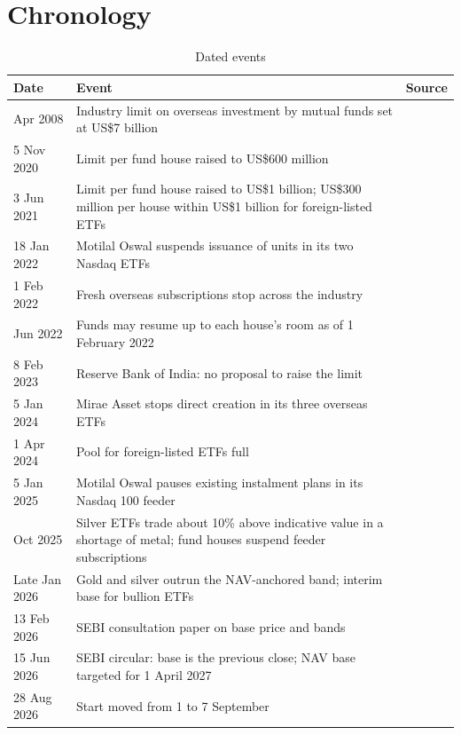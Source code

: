 \section{Chronology}\label{app:chronology}
\begin{table}[!t]
\centering\footnotesize
\caption{Dated events}\label{tab:chronology}
\begin{tabularx}{\textwidth}{L{2.6cm}YL{3.3cm}}
\toprule
Date & Event & Source\\
\midrule
Apr 2008 & Industry limit on overseas investment by mutual funds set at US\$7 billion & \citet{lawasia2026}\\
5 Nov 2020 & Limit per fund house raised to US\$600 million & \citet{bs2020limit}\\
3 Jun 2021 & Limit per fund house raised to US\$1 billion; US\$300 million per house within US\$1 billion for foreign-listed ETFs & \citet{bs2021limit}\\
18 Jan 2022 & Motilal Oswal suspends issuance of units in its two Nasdaq ETFs & \citet{bs2022motilal}\\
1 Feb 2022 & Fresh overseas subscriptions stop across the industry & \citet{pti2022resume}\\
Jun 2022 & Funds may resume up to each house's room as of 1 February 2022 & \citet{pti2022resume}\\
8 Feb 2023 & Reserve Bank of India: no proposal to raise the limit & \citet{bs2023rbi}\\
5 Jan 2024 & Mirae Asset stops direct creation in its three overseas ETFs & \citet{mirae2024addendum}\\
1 Apr 2024 & Pool for foreign-listed ETFs full & \citet{zerodha2024etf}\\
5 Jan 2025 & Motilal Oswal pauses existing instalment plans in its Nasdaq 100 feeder & \citet{et2025motilal}\\
Oct 2025 & Silver ETFs trade about 10\% above indicative value in a shortage of metal; fund houses suspend feeder subscriptions & \citet{bs2025silver}\\
Late Jan 2026 & Gold and silver outrun the NAV-anchored band; interim base for bullion ETFs & \citet{sebi2026cp}\\
13 Feb 2026 & SEBI consultation paper on base price and bands & \citet{sebi2026cp}\\
15 Jun 2026 & SEBI circular: base is the previous close; NAV base targeted for 1 April 2027 & \citet{sebi2026circular}\\
28 Aug 2026 & Start moved from 1 to 7 September & \citet{sebi2026ext}\\

\end{tabularx}
\end{table}
